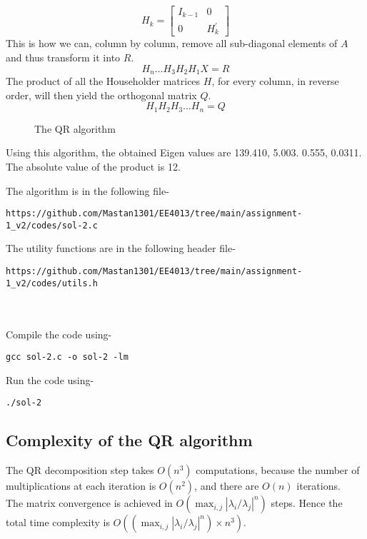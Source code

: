 \documentclass[journal,12pt,twocolumn]{IEEEtran}
\begin{document}
    $$
    H_{k}=\left[\begin{array}{cc}
    I_{k-1} & 0 \\
    0 & H_{k}^{\prime}
    \end{array}\right]
    $$
    This is how we can, column by column, remove all sub-diagonal elements of $A$ and thus transform it into $R$.
$$H_{n} \ldots H_{3} H_{2} H_{1} X=R$$
The product of all the Householder matrices $H$, for every column, in reverse order, will then yield the orthogonal matrix $Q$.
$$
H_{1} H_{2} H_{3} \ldots H_{n}=Q
$$

\begin{figure}[h!]
	\begin{center}
		\resizebox{\columnwidth/1}{!}{}
	\end{center}
	\caption{The QR algorithm}
	\label{fig:fig4}
\end{figure}

Using this algorithm, the obtained Eigen values are 139.410, 5.003. 0.555, 0.0311. The absolute value of the product is 12. 

The algorithm is in the following file- 
\begin{lstlisting}
https://github.com/Mastan1301/EE4013/tree/main/assignment-1_v2/codes/sol-2.c
\end{lstlisting}
The utility functions are in the following header file- 
\begin{lstlisting}
https://github.com/Mastan1301/EE4013/tree/main/assignment-1_v2/codes/utils.h
\end{lstlisting}
\\ ~ \\
Compile the code using-
\begin{lstlisting}
gcc sol-2.c -o sol-2 -lm
\end{lstlisting}
Run the code using-
\begin{lstlisting}
./sol-2
\end{lstlisting}

\subsection{Complexity of the QR algorithm}
The QR decomposition step takes $O(n ^ 3)$ computations, because the number of multiplications at each iteration is $O(n^2)$, and there are $O(n)$ iterations. \\
    The matrix convergence is achieved in $O(\max_{i, j} |\lambda_i / \lambda_j| ^ n)$ steps. Hence the total time complexity is $O((\max_{i, j} |\lambda_i / \lambda_j| ^ n) \times n ^ 3)$.
\end{document}
